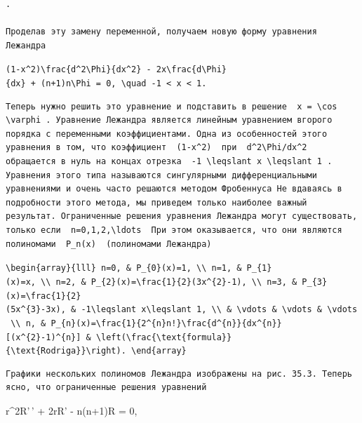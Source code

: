\documentclass[
  ukrainian,
]{article}
\begin{document}
\begin{verbatim}
.

Проделав эту замену переменной, получаем новую форму уравнения Лежандра
\end{verbatim}

\texttt{(1-x\^{}2)\textbackslash{}frac\{d\^{}2\textbackslash{}Phi\}\{dx\^{}2\}\ -\ 2x\textbackslash{}frac\{d\textbackslash{}Phi\}\{dx\}\ +\ (n+1)n\textbackslash{}Phi\ =\ 0,\ \textbackslash{}quad\ -1\ \textless{}\ x\ \textless{}\ 1.}

\begin{verbatim}
Теперь нужно решить это уравнение и подставить в решение  x = \cos \varphi . Уравнение Лежандра является линейным уравнением вгорого порядка с переменными коэффициентами. Одна из особенностей этого уравнения в том, что коэффициент  (1-x^2)  при  d^2\Phi/dx^2  обращается в нуль на концах отрезка  -1 \leqslant x \leqslant 1 . Уравнения этого типа называются сингулярными дифференциальными уравнениями и очень часто решаются методом Фробеннуса Не вдаваясь в подробности этого метода, мы приведем только наиболее важный результат. Ограниченные решения уравнения Лежандра могут существовать, только если  n=0,1,2,\ldots  При этом оказывается, что они являются полиномами  P_n(x)  (полиномами Лежандра)
\end{verbatim}

\texttt{\textbackslash{}begin\{array\}\{lll\}\ n=0,\ \&\ P\_\{0\}(x)=1,\ \textbackslash{}\textbackslash{}\ n=1,\ \&\ P\_\{1\}(x)=x,\ \textbackslash{}\textbackslash{}\ n=2,\ \&\ P\_\{2\}(x)=\textbackslash{}frac\{1\}\{2\}(3x\^{}\{2\}-1),\ \textbackslash{}\textbackslash{}\ n=3,\ \&\ P\_\{3\}(x)=\textbackslash{}frac\{1\}\{2\}(5x\^{}\{3\}-3x),\ \&\ -1\textbackslash{}leqslant\ x\textbackslash{}leqslant\ 1,\ \textbackslash{}\textbackslash{}\ \&\ \textbackslash{}vdots\ \&\ \textbackslash{}vdots\ \&\ \textbackslash{}vdots\ \textbackslash{}\textbackslash{}\ n,\ \&\ P\_\{n\}(x)=\textbackslash{}frac\{1\}\{2\^{}\{n\}n!\}\textbackslash{}frac\{d\^{}\{n\}\}\{dx\^{}\{n\}\}{[}(x\^{}\{2\}-1)\^{}\{n\}{]}\ \&\ \textbackslash{}left(\textbackslash{}frac\{\textbackslash{}text\{formula\}\}\{\textbackslash{}text\{Rodriga\}\}\textbackslash{}right).\ \textbackslash{}end\{array\}}

\begin{verbatim}
Графики нескольких полиномов Лежандра изображены на рис. 35.3. Теперь ясно, что ограниченные решения уравнений
\end{verbatim}

r\^{}2R'\,' + 2rR' - n(n+1)R = 0,
\end{document}
